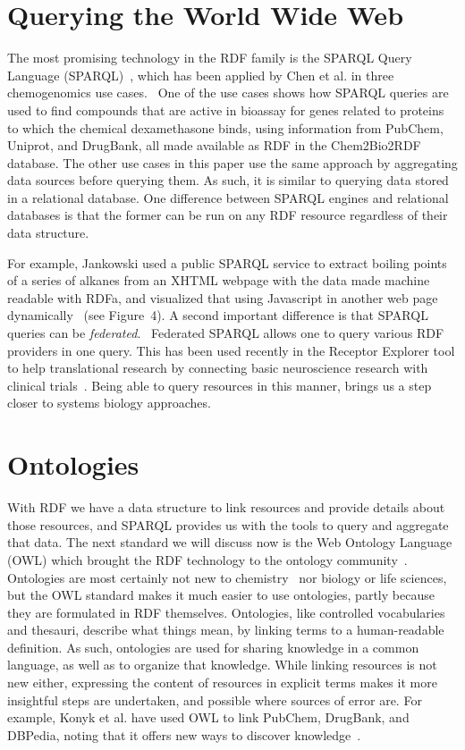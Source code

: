 \documentclass[10pt]{bmc_article}
\newenvironment{bmcformat}{\begin{raggedright}\baselineskip20pt\sloppy\setboolean{publ}{false}}{\end{raggedright}\baselineskip20pt\sloppy}
\begin{document}
\begin{bmcformat}
\section{Querying the World Wide Web}

The most promising technology in the RDF family is the
SPARQL Query Language (SPARQL)~\cite{PrudHommeaux2008}, which has been
applied by Chen et al. in three chemogenomics use cases.~\cite{CHE2010}
One of the use cases shows how SPARQL queries are used to find compounds 
that are active in bioassay for genes related to proteins
to which the chemical dexamethasone binds, using information
from PubChem, Uniprot, and DrugBank, all made available as RDF in the Chem2Bio2RDF
database. The other use cases in this paper use the same approach
by aggregating data sources before querying them. As such, it is similar to
querying data stored in a relational database. One difference between SPARQL
engines and relational databases is that the former can be run on any
RDF resource regardless of their data structure.

For example, Jankowski used a public
SPARQL service to extract boiling points of a series of alkanes from an XHTML
webpage with the data made machine readable with RDFa, and visualized that using
Javascript in another web page dynamically~\cite{Jankowski2010} (see
Figure~4). A second important difference is that SPARQL queries can be
\textit{federated}.~\cite{Prudhommeaux2007Custom}
Federated SPARQL allows one to query various RDF providers in one query. This has
been used recently in the Receptor Explorer tool to help translational research
by connecting basic neuroscience research with clinical trials~\cite{Cheung2009}.
Being able to query resources in this manner, brings us a step closer to
systems biology approaches.

\section{Ontologies}

With RDF we have a data structure to link resources and provide details about
those resources, and SPARQL provides us with the tools to query and aggregate that data.
The next standard we will discuss now is the Web Ontology
Language (OWL) which brought the RDF technology to the ontology community~\cite{GUN2004}.
Ontologies are most certainly not new to chemistry~\cite{Gordon1988} nor biology or life sciences,
but the OWL standard makes it much easier to use ontologies, partly because
they are formulated in RDF themselves. Ontologies, like
controlled vocabularies and thesauri, describe what things mean, by linking
terms to a human-readable definition. As such, ontologies are used for sharing
knowledge in a common language, as well as to organize that knowledge.
While linking resources is not new either, expressing the content of resources
in explicit terms makes it more insightful steps are undertaken, and possible
where sources of error are. For example, Konyk et al. have used OWL to link PubChem,
DrugBank, and DBPedia, noting that it offers new ways to
discover knowledge~\cite{Konyk2008}.


\end{bmcformat}
\end{document}
